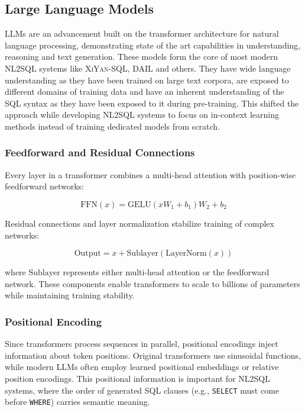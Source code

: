 \subsection{Large Language Models}

LLMs are an advancement built on the transformer architecture for natural
language processing, demonstrating state of the art capabilities in
understanding, reasoning and text generation. These models form the core of
most modern NL2SQL systems like \textsc{XiYan-SQL}, \textsc{DAIL} and others.
They have wide language understanding as they have been trained on large text
corpora, are exposed to different domains of training data and have an inherent
understanding of the SQL syntax as they have been exposed to it during
pre-training. This shifted the approach while developing NL2SQL systems to
focus on in-context learning methods instead of training dedicated models from
scratch.

\subsubsection{Feedforward and Residual Connections}

Every layer in a transformer combines a multi-head attention with position-wise
feedforward networks:

\begin{equation}
\text{FFN}(x) = \text{GELU}(xW_1 + b_1)W_2 + b_2
\end{equation}

Residual connections and layer normalization stabilize training of complex
networks:

\begin{equation}
    \text{Output} = x + \text{Sublayer}(\text{LayerNorm}(x))
\end{equation}

where $\text{Sublayer}$ represents either multi-head attention or the
feedforward network. These components enable transformers to scale to billions
of parameters while maintaining training stability.

\subsubsection{Positional Encoding}

Since transformers process sequences in parallel, positional encodings inject
information about token positions. Original transformers use sinusoidal
functions, while modern LLMs often employ learned positional embeddings or
relative position encodings. This positional information is important for
NL2SQL systems, where the order of generated SQL clauses (e.g., \texttt{SELECT}
must come before \texttt{WHERE}) carries semantic meaning.


